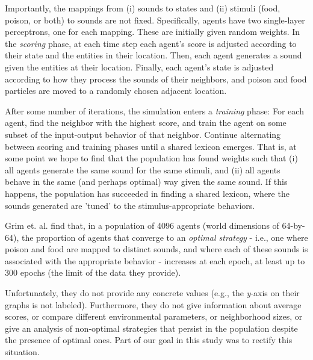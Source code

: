 Importantly, the mappings from (i) sounds to states and (ii) stimuli (food, poison, or both) to sounds are not fixed. Specifically, agents have 
two single-layer perceptrons, one for each mapping. These are initially given random weights. In the \textit{scoring} phase, at each time step 
each agent's score is adjusted according to their state and the entities in their location. Then, each agent generates a sound given the entities 
at their location. Finally, each agent's state is adjusted according to how they process the sounds of their neighbors, and poison and food particles are 
moved to a randomly chosen adjacent location.

After some number of iterations, the simulation enters a \textit{training} phase: For each agent, find the neighbor 
with the highest score, and train the agent on some subset of the input-output behavior of that neighbor. Continue alternating between scoring and 
training phases until a shared lexicon emerges. That is, at some point we hope to find that the population has found weights such that 
(i) all agents generate the same sound for the same stimuli, and (ii) all agents behave in the same (and perhaps optimal) way given the same sound. 
If this happens, the population has succeeded in finding a shared lexicon, where the sounds generated are 'tuned' to the 
stimulus-appropriate behaviors.

Grim et. al. find that, in a population of 4096 agents (world dimensions of 64-by-64), the proportion of agents that converge to an \textit{optimal 
strategy} - i.e., one where poison and food are mapped to distinct sounds, and where each of these sounds is associated with the appropriate behavior - 
increases at each epoch, at least up to 300 epochs (the limit of the data they provide). 

Unfortunately, they do not provide any concrete values (e.g., the \textit{y}-axis on their graphs is not labeled). Furthermore, they do not give information about average scores, or compare different environmental parameters, or neighborhood sizes, or give an analysis of non-optimal strategies that persist in the 
population despite the presence of optimal ones. Part of our goal in this study was to rectify this situation.
